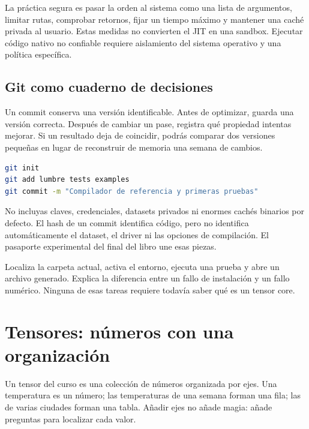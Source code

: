 \documentclass[12pt,a4paper,oneside]{report}
\begin{document}
La práctica segura es pasar la orden al sistema como una lista de argumentos, limitar rutas, comprobar retornos, fijar un tiempo máximo y mantener una caché privada al usuario. Estas medidas no convierten el JIT en una sandbox. Ejecutar código nativo no confiable requiere aislamiento del sistema operativo y una política específica.

\section{Git como cuaderno de decisiones}
Un commit conserva una versión identificable. Antes de optimizar, guarda una versión correcta. Después de cambiar un pase, registra qué propiedad intentas mejorar. Si un resultado deja de coincidir, podrás comparar dos versiones pequeñas en lugar de reconstruir de memoria una semana de cambios.

\begin{lstlisting}[language=bash]
git init
git add lumbre tests examples
git commit -m "Compilador de referencia y primeras pruebas"
\end{lstlisting}
No incluyas claves, credenciales, datasets privados ni enormes cachés binarios por defecto. El hash de un commit identifica código, pero no identifica automáticamente el dataset, el driver ni las opciones de compilación. El pasaporte experimental del final del libro une esas piezas.

\begin{comprueba}
Localiza la carpeta actual, activa el entorno, ejecuta una prueba y abre un archivo generado. Explica la diferencia entre un fallo de instalación y un fallo numérico. Ninguna de esas tareas requiere todavía saber qué es un tensor core.

\end{comprueba}

\chapter{Tensores: números con una organización}
\label{ch:tensores}
\begin{idea}
Un tensor del curso es una colección de números organizada por ejes. Una temperatura es un número; las temperaturas de una semana forman una fila; las de varias ciudades forman una tabla. Añadir ejes no añade magia: añade preguntas para localizar cada valor.

\end{idea}
\end{document}
